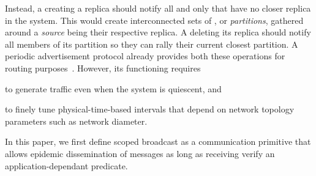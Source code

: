 Instead, a \process creating a replica should notify all and only
\processes that have no closer replica in the system. This would
create interconnected sets of \processes, or \emph{partitions},
gathered around a \emph{source} being their respective replica. A
\process deleting its replica should notify all members of its
partition so they can rally their current closest partition. A
periodic advertisement protocol already provides both these operations
for routing purposes~\cite{hemmati2015namebased}. However, its
functioning requires
\begin{inparaenum}[(i)]
\item to generate traffic even when the system is quiescent, and
\item to finely tune physical-time-based intervals that depend on
  network topology parameters such as network diameter.
\end{inparaenum}


In this paper, we first define scoped broadcast as a communication
primitive that allows epidemic dissemination of messages as long as
receiving \processes verify an application-dependant predicate.

